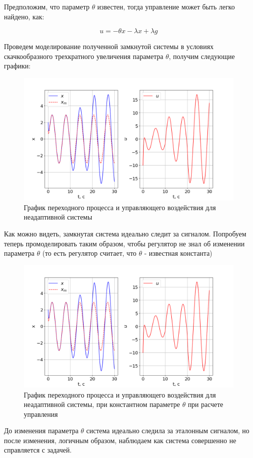 Предположим, что параметр $\theta$ известен, тогда управление может быть легко найдено, как:

\begin{equation}
    u = -\theta x - \lambda x + \lambda g
    \label{control}
\end{equation}

Проведем моделирование полученной замкнутой системы в условиях скачкообразного трехкратного увеличения параметра $\theta$, получим следующие графики:

\begin{figure}
    \centerline{\includegraphics[width=\linewidth]{images/task_1.png}}
    \caption{График переходного процесса и управляющего воздействия для неадаптивной системы}
    \label{10}
\end{figure}

Как можно видеть, замкнутая система идеально следит за сигналом.
Попробуем теперь промоделировать таким образом, чтобы регулятор не знал об изменении параметра $\theta$ (то есть регулятор считает, что $\theta$ - известная константа)

\begin{figure}
    \centerline{\includegraphics[width=\linewidth]{images/task_1_2.png}}
    \caption{График переходного процесса и управляющего воздействия для неадаптивной системы, при константном параметре $\theta$ при расчете управления}
    \label{11}
\end{figure}

До изменения параметра $\theta$ система идеально следила за эталонным сигналом, но после изменения, логичным образом, наблюдаем как система совершенно не справляется с задачей.

